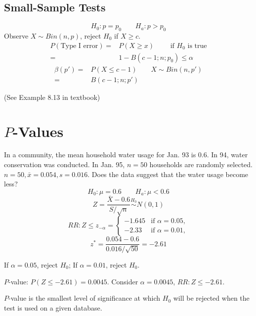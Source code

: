 \subsection{Small-Sample Tests}
\[H_0:p=p_0 \qquad H_a:p>p_0\]
Observe $X \sim Bin(n,p)$, reject $H_0$ if $X\geq c$.
\begin{align*}
P(\text{Type I error})= & P(X \geq x) \qquad \text{ if }H_0 \text{ is true} \\
= & 1- B(c-1;n;p_0) \leq\alpha
\end{align*}
\begin{align*}
\beta(p')= & P(X \leq c-1) \qquad X \sim Bin(n,p') \\
= & B(c-1;n;p')
\end{align*}

\begin{exmp}
(See Example 8.13 in textbook)
\end{exmp}

\section{$P$-Values}
\begin{exmp}
In a community, the mean household water usage for Jan. 93 is 0.6. In 94, water conservation was conducted. In Jan. 95, $n=50$ households are randomly selected. $n=50,\bar{x}=0.054,s=0.016$. Does the data suggest that the water usage become less?
\[H_0:\mu=0.6 \qquad H_a:\mu<0.6\]
\[Z=\frac{\bar{X}-0.6}{S/\sqrt{n}}\overset{H_0}{\sim} N(0,1)\]
\[RR: Z\leq z_{-\alpha}=\begin{cases}
-1.645 &\text{if }\alpha=0.05, \\
-2.33 &\text{if }\alpha=0.01, 
\end{cases}\]
\[z^*=\frac{0.054-0.6}{0.016/\sqrt{50}}=-2.61\]

If $\alpha=0.05$, reject $H_0$; If $\alpha=0.01$, reject $H_0$.

$P$-value: $P(Z\leq-2.61)=0.0045$. Consider $\alpha=0.0045$, $RR:Z\leq-2.61$.
\end{exmp}

\begin{defn}
$P$-value is the smallest level of significance at which $H_0$ will be rejected when the test is used on a given database.
\end{defn}

\noindent{}

